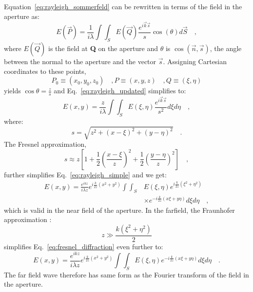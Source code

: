Equation~\eqref{eq:rayleigh_sommerfeld} can be rewritten in terms of the field in the aperture as:
\begin{equation}
\label{eq:rayleigh_updated}
E(\vec{P}) = \frac{1}{i\lambda}\int \int _S E(\vec{Q}) \frac{e^{i\vec{k}\vec{s}}}{s} \cos (\theta) d\vec{S} \quad ,
\end{equation}
where $E(\vec{Q})$ is the field at \textbf{Q} on the aperture and $\theta$ is $\cos (\vec{n},\vec{s})$, the angle between the normal to the aperture and the vector $\vec{s}$. Assigning Cartesian coordinates to these points,
\begin{subequations}
\begin{equation}
P_0 \equiv \left(x_0, y_0, z_0\right) \quad ,
\end{equation}
\begin{equation}
P \equiv \left(x, y, z\right) \quad ,
\end{equation}
\begin{equation}
Q \equiv \left( \xi , \eta \right) 
\end{equation}
\end{subequations}
yields $\cos \theta = \frac{z}{s}$ and  Eq.~\eqref{eq:rayleigh_updated} simplifies to:
\begin{equation}
\label{eq:rayleigh_simple}
E\left( x,y\right) = \frac{z}{i\lambda}\int \int _S E(\xi,\eta) \frac{e^{i\vec{k}\vec{s}}}{s^2} d\xi d\eta \quad ,
\end{equation}
where:
\begin{equation}
s = \sqrt{z^2 + \left( x - \xi \right) ^2 + \left( y-\eta \right) ^2} \quad .
\end{equation}
The Fresnel approximation,
\begin{equation}
\label{eq:fresnel_approx}
s \approx z\left[ 1 + \frac{1}{2}\left(\frac{x-\xi}{z}\right)^2 
							  + \frac{1}{2}\left(\frac{y-\eta}{z}\right)^2\right] \quad ,
\end{equation}
further simplifies Eq.~\eqref{eq:rayleigh_simple} and we get:
\begin{equation}
\label{eq:fresnel_diffraction}
\begin{split}
E\left( x,y\right) = \frac{e^{ikz}}{i\lambda z}e^{i\frac{k}{2z}(x^2+y^2)}\int \int _{S} & E\left( \xi , \eta \right) e^{i\frac{k}{2z}(\xi^2+\eta ^2)} \\
& \times e^{-i\frac{k}{2z}(x\xi+y\eta)} d\xi d\eta \quad ,
\end{split}
\end{equation}
which is valid in the near field of the aperture. In the farfield, the Fraunhofer approximation \cite{goodmanfourier}:
\begin{equation}
\label{eq:fraunhofer_approx}
z \gg \frac{k\left( \xi ^2 + \eta ^2\right)}{2}
\end{equation}
simplifies Eq.~\eqref{eq:fresnel_diffraction} even further to:
\begin{equation}
\label{eq:fraunhofer_diffraction}
E\left( x,y\right) = \frac{e^{ikz}}{i\lambda z}e^{i\frac{k}{2z}(x^2+y^2)}\int \int _{S}  E \left( \xi , \eta \right) e^{-i\frac{k}{2z}(x\xi+y\eta )} d\xi d\eta \quad .
\end{equation}
The far field wave therefore has same form as the Fourier transform of the field in the aperture.


